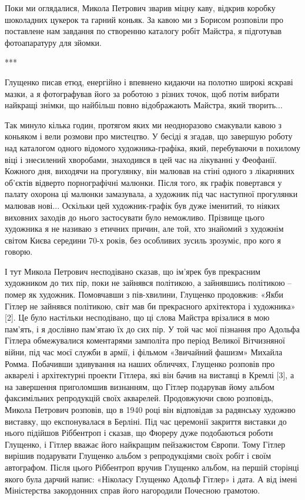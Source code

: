 Поки ми оглядалися, Микола Петрович зварив міцну каву, відкрив коробку
шоколадних цукерок та гарний коньяк. За кавою ми з Борисом розповіли про
поставлене нам завдання по створенню каталогу робіт Майстра, я підготував
фотоапаратуру для зйомки.

***

Глущенко писав етюд, енергійно і впевнено кидаючи на полотно широкі яскраві
мазки, а я фотографував його за роботою з різних точок, щоб потім вибрати
найкращі знімки, що найбільш повно відображають Майстра, який творить...

Так минуло кілька годин, протягом яких ми неодноразово смакували кавою з
коньяком і вели розмови про мистецтво. У бесіді я згадав, що завершую роботу
над каталогом одного відомого художника-графіка, який, перебуваючи в похилому
віці і знесилений хворобами, знаходився в цей час на лікуванні у Феофанії.
Кожного дня, виходячи на прогулянку, він малював на стіні одного з лікарняних
об'єктів відверто порнографічні малюнки. Після того, як графік повертався у
палату охорона ці малюнки замазувала, а художник під час наступної прогулянки
малював нові... Оскільки цей художник-графік був дуже іменитий, то ніяких
виховних заходів до нього застосувати було неможливо. Прізвище цього художника
я не називаю з етичних причин, але той, хто знайомий з художнім світом Києва
середини 70-х років, без особливих зусиль зрозуміє, про кого я говорю.

І тут Микола Петрович несподівано сказав, що ім'ярек був прекрасним художником
до тих пір, поки не зайнявся політикою, а зайнявшись політикою – помер як
художник. Помовчавши з пів-хвилини, Глущенко продовжив: «Якби Гітлер не
зайнявся політикою, світ мав би прекрасного архітектора і художника» [2]. Це
було настільки несподівано, що ці слова Майстра врізалися в мою пам'ять, і я
дослівно пам'ятаю їх до сих пір. У той час мої пізнання про Адольфа Гітлера
обмежувалися коментарями замполіта про період Великої Вітчизняної війни, під
час моєї служби в армії, і фільмом «Звичайний фашизм» Михайла Ромма. Побачивши
здивування на наших обличчях, Глущенко розповів про акварелі і архітектурні
проекти Гітлера, які він бачив на виставці в Кремлі [3], а на завершення
приголомшив визнанням, що Гітлер подарував йому альбом факсимільних репродукцій
своїх акварелей. Продовжуючи свою розповідь, Микола Петрович розповів, що в
1940 році він відповідав за радянську художню виставку, що експонувалася в
Берліні. Під час церемонії закриття виставки до нього підійшов Ріббентроп і
сказав, що Фюреру дуже подобаються роботи Глущенко, і Гітлер вважає його
найкращим пейзажистом Європи. Тому Гітлер вирішив подарувати Глущенко альбом з
репродукціями своїх робіт і своїм автографом. Після цього Ріббентроп вручив
Глущенко альбом, на першій сторінці якого була дарчий напис: «Ніколасу Глущенко
Адольф Гітлер» і дата. А від імені Міністерства закордонних справ його
нагородили Почесною грамотою.

